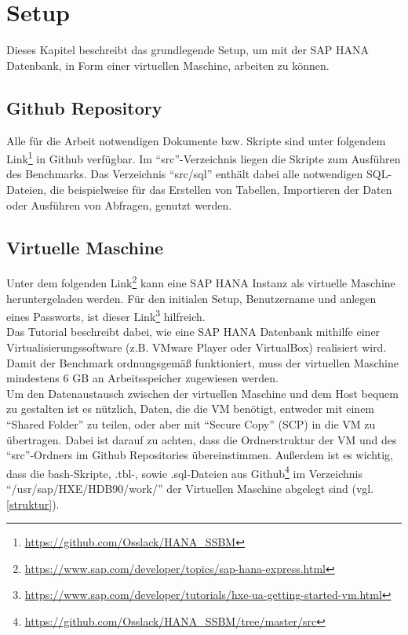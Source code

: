 \chapter{Setup}
Dieses Kapitel beschreibt das grundlegende Setup, um mit der SAP HANA Datenbank, in Form einer virtuellen Maschine, arbeiten zu können.

\section{Github Repository}
Alle für die Arbeit notwendigen Dokumente bzw. Skripte sind unter folgendem Link\footnote{\url{https://github.com/Osslack/HANA_SSBM}} in Github verfügbar. Im \enquote{src}-Verzeichnis liegen die Skripte zum Ausführen des Benchmarks. Das Verzeichnis \enquote{src/sql} enthält dabei alle notwendigen SQL-Dateien, die beispielweise für das Erstellen von Tabellen, Importieren der Daten oder Ausführen von Abfragen, genutzt werden. 


\section{Virtuelle Maschine}
Unter dem folgenden Link\footnote{\url{https://www.sap.com/developer/topics/sap-hana-express.html}}  kann eine SAP HANA Instanz als virtuelle Maschine heruntergeladen werden. Für den initialen Setup, Benutzername und anlegen eines Passworts, ist dieser Link\footnote{\url{https://www.sap.com/developer/tutorials/hxe-ua-getting-started-vm.html}}  hilfreich.\\
Das Tutorial beschreibt dabei, wie eine SAP HANA Datenbank mithilfe einer Virtualisierungssoftware (z.B. VMware Player oder VirtualBox) realisiert wird.\\Damit der Benchmark ordnungsgemäß funktioniert, muss der virtuellen Maschine mindestens 6 GB an Arbeitsspeicher zugewiesen werden. \\Um den Datenaustausch zwischen der virtuellen Maschine und dem Host bequem zu gestalten ist es nützlich, Daten, die die VM benötigt, entweder mit einem \enquote{Shared Folder} zu teilen, oder aber mit \enquote{Secure Copy} (SCP) in die VM zu übertragen. Dabei ist darauf zu achten, dass die Ordnerstruktur der VM und des \enquote{src}-Ordners im Github Repositories  übereinstimmen. Außerdem ist es wichtig, dass die bash-Skripte, .tbl-, sowie .sql-Dateien aus Github\footnote{\url{https://github.com/Osslack/HANA_SSBM/tree/master/src}} im Verzeichnis \enquote{/usr/sap/HXE/HDB90/work/}  der Virtuellen Maschine abgelegt sind (vgl. \autoref{struktur}).

